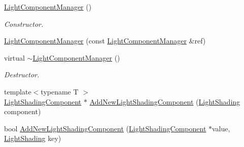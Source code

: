 \begin{DoxyCompactItemize}
\item 
\mbox{\label{class_geometry_engine_1_1_light_utils_1_1_light_component_manager_a1f77e3c649c1fd460ba12298fe88defa}} 
\mbox{\hyperlink{class_geometry_engine_1_1_light_utils_1_1_light_component_manager_a1f77e3c649c1fd460ba12298fe88defa}{Light\+Component\+Manager}} ()
\begin{DoxyCompactList}\small\item\em Constructor. \end{DoxyCompactList}\item 
\mbox{\hyperlink{class_geometry_engine_1_1_light_utils_1_1_light_component_manager_a5df9525266ca550924bd395075132485}{Light\+Component\+Manager}} (const \mbox{\hyperlink{class_geometry_engine_1_1_light_utils_1_1_light_component_manager}{Light\+Component\+Manager}} \&ref)
\item 
\mbox{\label{class_geometry_engine_1_1_light_utils_1_1_light_component_manager_a456d8db6aba307b77a5e98f317c96f85}} 
virtual \mbox{\hyperlink{class_geometry_engine_1_1_light_utils_1_1_light_component_manager_a456d8db6aba307b77a5e98f317c96f85}{$\sim$\+Light\+Component\+Manager}} ()
\begin{DoxyCompactList}\small\item\em Destructor. \end{DoxyCompactList}\item 
{\footnotesize template$<$typename T $>$ }\\\mbox{\hyperlink{class_geometry_engine_1_1_light_utils_1_1_light_shading_component}{Light\+Shading\+Component}} $\ast$ \mbox{\hyperlink{class_geometry_engine_1_1_light_utils_1_1_light_component_manager_a41569931e24cebf0285474c55f54164a}{Add\+New\+Light\+Shading\+Component}} (\mbox{\hyperlink{namespace_geometry_engine_1_1_light_utils_a16eb370137c2fd151e6f8e1d07cd23e0}{Light\+Shading}} component)
\item 
bool \mbox{\hyperlink{class_geometry_engine_1_1_light_utils_1_1_light_component_manager_a70a226e94e3f7369348e3ed9de7ee5bb}{Add\+New\+Light\+Shading\+Component}} (\mbox{\hyperlink{class_geometry_engine_1_1_light_utils_1_1_light_shading_component}{Light\+Shading\+Component}} $\ast$value, \mbox{\hyperlink{namespace_geometry_engine_1_1_light_utils_a16eb370137c2fd151e6f8e1d07cd23e0}{Light\+Shading}} key)

\end{DoxyCompactItemize}
